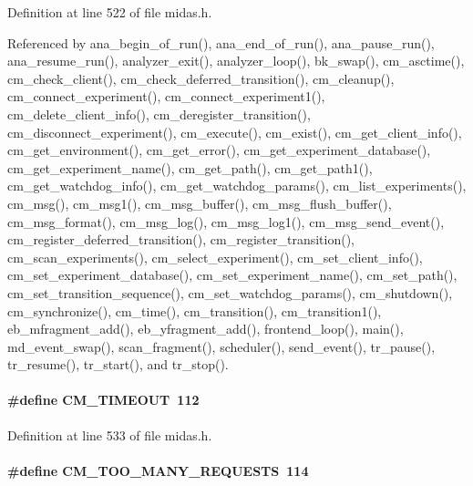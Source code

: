 Definition at line 522 of file midas.h.

Referenced by ana\_\-begin\_\-of\_\-run(), ana\_\-end\_\-of\_\-run(), ana\_\-pause\_\-run(), ana\_\-resume\_\-run(), analyzer\_\-exit(), analyzer\_\-loop(), bk\_\-swap(), cm\_\-asctime(), cm\_\-check\_\-client(), cm\_\-check\_\-deferred\_\-transition(), cm\_\-cleanup(), cm\_\-connect\_\-experiment(), cm\_\-connect\_\-experiment1(), cm\_\-delete\_\-client\_\-info(), cm\_\-deregister\_\-transition(), cm\_\-disconnect\_\-experiment(), cm\_\-execute(), cm\_\-exist(), cm\_\-get\_\-client\_\-info(), cm\_\-get\_\-environment(), cm\_\-get\_\-error(), cm\_\-get\_\-experiment\_\-database(), cm\_\-get\_\-experiment\_\-name(), cm\_\-get\_\-path(), cm\_\-get\_\-path1(), cm\_\-get\_\-watchdog\_\-info(), cm\_\-get\_\-watchdog\_\-params(), cm\_\-list\_\-experiments(), cm\_\-msg(), cm\_\-msg1(), cm\_\-msg\_\-buffer(), cm\_\-msg\_\-flush\_\-buffer(), cm\_\-msg\_\-format(), cm\_\-msg\_\-log(), cm\_\-msg\_\-log1(), cm\_\-msg\_\-send\_\-event(), cm\_\-register\_\-deferred\_\-transition(), cm\_\-register\_\-transition(), cm\_\-scan\_\-experiments(), cm\_\-select\_\-experiment(), cm\_\-set\_\-client\_\-info(), cm\_\-set\_\-experiment\_\-database(), cm\_\-set\_\-experiment\_\-name(), cm\_\-set\_\-path(), cm\_\-set\_\-transition\_\-sequence(), cm\_\-set\_\-watchdog\_\-params(), cm\_\-shutdown(), cm\_\-synchronize(), cm\_\-time(), cm\_\-transition(), cm\_\-transition1(), eb\_\-mfragment\_\-add(), eb\_\-yfragment\_\-add(), frontend\_\-loop(), main(), md\_\-event\_\-swap(), scan\_\-fragment(), scheduler(), send\_\-event(), tr\_\-pause(), tr\_\-resume(), tr\_\-start(), and tr\_\-stop().
\paragraph[{CM\_\-TIMEOUT}]{\setlength{\rightskip}{0pt plus 5cm}\#define CM\_\-TIMEOUT~112}\hfill\label{group__err21_ga3f98d4cb53674e51840088d7c8435d85}

\begin{DoxyItemize}
\item 
\end{DoxyItemize}

Definition at line 533 of file midas.h.
\paragraph[{CM\_\-TOO\_\-MANY\_\-REQUESTS}]{\setlength{\rightskip}{0pt plus 5cm}\#define CM\_\-TOO\_\-MANY\_\-REQUESTS~114}\hfill\label{group__err21_ga651caeed4e07732c8ce40c41c69ba9a2}


